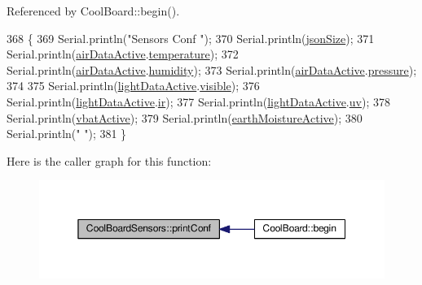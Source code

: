 Referenced by Cool\+Board\+::begin().


\begin{DoxyCode}
368 \{
369     Serial.println(\textcolor{stringliteral}{"Sensors Conf "});
370     Serial.println(\hyperlink{classCoolBoardSensors_a05a40dc80bfff14ffb830f549b876f8d}{jsonSize});
371     Serial.println(\hyperlink{classCoolBoardSensors_abff8dfeccb2f7689847bb64d5f1cd31e}{airDataActive}.\hyperlink{structCoolBoardSensors_1_1airActive_a9a6633c426b0508e30ebc1832ec6d745}{temperature});
372     Serial.println(\hyperlink{classCoolBoardSensors_abff8dfeccb2f7689847bb64d5f1cd31e}{airDataActive}.\hyperlink{structCoolBoardSensors_1_1airActive_ae5740445054b27415e22f450576accb7}{humidity});
373     Serial.println(\hyperlink{classCoolBoardSensors_abff8dfeccb2f7689847bb64d5f1cd31e}{airDataActive}.\hyperlink{structCoolBoardSensors_1_1airActive_ab200826a70d1dc9945f5efb6b9c732ed}{pressure});
374 
375     Serial.println(\hyperlink{classCoolBoardSensors_ac4deb1cf41bac8b91c780c92fab00ba4}{lightDataActive}.\hyperlink{structCoolBoardSensors_1_1lightActive_abcbba296b6a95e67c0cd2555d9dd50c7}{visible});
376     Serial.println(\hyperlink{classCoolBoardSensors_ac4deb1cf41bac8b91c780c92fab00ba4}{lightDataActive}.\hyperlink{structCoolBoardSensors_1_1lightActive_a67700895349b95ceb263f1a6da756315}{ir});
377     Serial.println(\hyperlink{classCoolBoardSensors_ac4deb1cf41bac8b91c780c92fab00ba4}{lightDataActive}.\hyperlink{structCoolBoardSensors_1_1lightActive_a949a7aaf5166d981de8fe0fd93da20d6}{uv});
378     Serial.println(\hyperlink{classCoolBoardSensors_af5039ad760b0ff0aa7eee16c55e81702}{vbatActive});
379     Serial.println(\hyperlink{classCoolBoardSensors_a46dfddb8a12720e92cd2825ef09023c8}{earthMoistureActive});
380     Serial.println(\textcolor{stringliteral}{" "});
381 \}
\end{DoxyCode}
Here is the caller graph for this function\+:
\nopagebreak
\begin{figure}[H]
\begin{center}
\leavevmode
\includegraphics[width=350pt]{classCoolBoardSensors_af6fd79505815b204c178617ecf54c873_icgraph}
\end{center}
\end{figure}
\mbox{\label{classCoolBoardSensors_a91badb2539d91fda8679f2a597874c48}} 
